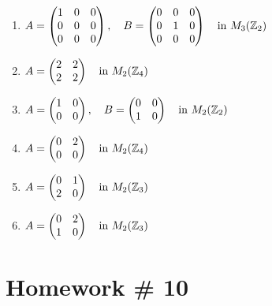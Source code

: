 \begin{enumerate}
    \item[\#11)] $ A = \begin{pmatrix} 1 & 0 & 0 \\ 0 & 0 & 0 \\ 0 & 0 & 0 \end{pmatrix}, \quad 
                   B = \begin{pmatrix} 0 & 0 & 0 \\ 0 & 1 & 0 \\ 0 & 0 & 0 \end{pmatrix} 
                   \quad \text{in } M_3({\mathbb{Z}}_2) $
    \item[\#12)] $ A = \begin{pmatrix} 2 & 2 \\ 2 & 2 \end{pmatrix} 
                   \quad \text{in } M_2({\mathbb{Z}}_4) $
    \item[\#13)] $ A = \begin{pmatrix} 1 & 0 \\ 0 & 0 \end{pmatrix}, \quad 
                  B = \begin{pmatrix} 0 & 0 \\ 1 & 0 \end{pmatrix} 
                  \quad \text{in } M_2({\mathbb{Z}}_2) $
    \item[\#14)] $ A = \begin{pmatrix} 0 & 2 \\ 0 & 0 \end{pmatrix} 
                   \quad \text{in } M_2({\mathbb{Z}}_4) $
    \item[\#15)] $ A = \begin{pmatrix} 0 & 1 \\ 2 & 0 \end{pmatrix} 
                  \quad \text{in } M_2({\mathbb{Z}}_3) $
    \item[\#16)] $ A = \begin{pmatrix} 0 & 2 \\ 1 & 0 \end{pmatrix} 
                  \quad \text{in } M_2({\mathbb{Z}}_3) $
\end{enumerate}

\newpage

\section{Homework \# 10}
\label{sec:HW10}

